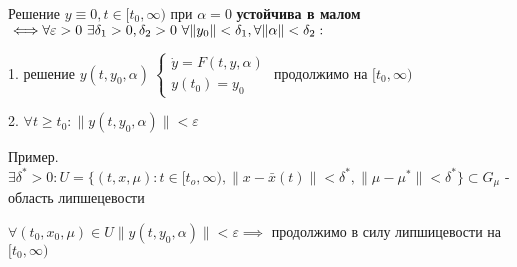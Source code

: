 \documentclass[12pt, a4paper]{article}
\begin{document}
  Решение $y \equiv 0, t \in [t_0, \infty)$ при $\alpha = 0$ \textbf{устойчива в малом} $\iff \\
  \forall \varepsilon > 0 \ \exists \delta_1 > 0, \delta_2 > 0 \ \forall \|y_0\| < \delta_1, \forall \| \alpha \| < \delta_2 :$

  1. решение $y(t, y_0, \alpha) \ \begin{cases}
    \dot y = F(t, y ,\alpha) \\ y(t_0) = y_0
  \end{cases}$ продолжимо на $[t_0, \infty)$

  2. $\forall t \ge t_0 : \| y(t, y_0, \alpha) \| < \varepsilon $

  Пример. $\exists \delta^* > 0 : U = \{(t, x, \mu) : t \in [t_o, \infty), \| x - \bar x(t) \| < \delta^*, \| \mu - \mu^* \| < \delta^*\} \subset G_\mu$  - область липшецевости

  $\forall (t_0, x_0, \mu) \in U \| y(t, y_0, \alpha) \| < \varepsilon \implies $ продолжимо в силу липшицевости на $[t_0, \infty)$
\end{document}
